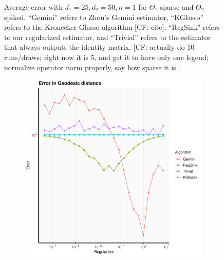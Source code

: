 \documentclass[aos]{imsart}
\theoremstyle{definition}
\numberwithin{equation}{section}
\newcommand{\CF}[1]{{\color{purple}[CF: #1]}}
\begin{document}
\begin{figure}
\begin{subfigure}[b]{0.3\textwidth}
     \end{subfigure}
\caption{Average error with $d_1 = 25, d_2 = 50, n = 1$ for $\Theta_1$ sparse and $\Theta_2$ spiked. ``Gemini'' refers to Zhou's Gemini estimator, ``KGlasso'' refers to the Kronecker Glasso algorithm \CF{cite}, ``RegSink" refers to our regularized estimator, and ``Trivial'' refers to the estimator that always outputs the identity matrix. \CF{actually do 10 runs/draws; right now it is 5, and get it to have only one legend; normalize operator norm properly, say how sparse it is.}}\label{fig:sparse-i}
\end{figure}

\begin{figure}
     \centering
     \begin{subfigure}[b]{0.3\textwidth}
         \centering
         \includegraphics[width=\textwidth]{./code/zhou-comparison/25-50-doubly-sparse-geo.pdf}
     \end{subfigure}
     \hfill
     \begin{subfigure}[b]{0.3\textwidth}
         \centering

\end{subfigure}
\end{figure}
\end{document}
